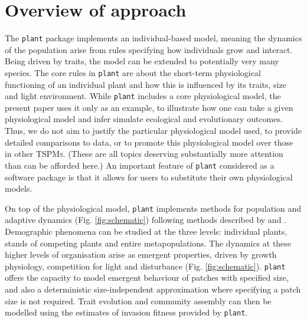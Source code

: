 \documentclass[a4paper,11pt]{article}
\newcommand{\plant}{\texttt{plant}}
\begin{document}
\section{Overview of approach}

The {\plant} package implements an individual-based model, meaning the dynamics of the
population arise from rules specifying how individuals grow and interact.
Being driven by traits, the model can be extended to potentially very many species. The
core rules in {\plant} are about the short-term physiological
functioning of an individual plant and how this is influenced by its
traits, size and light environment.  While {\plant} includes a core physiological model, the present paper uses it only as an example, to illustrate how one can take a given physiological model and infer simulate ecological and evolutionary outcomes. Thus, we do not aim to justify the particular physiological model used, to provide detailed
comparisons to data, or to promote this physiological model over those
in other \textsc{TSPMs}. (These are all topics deserving substantially
more attention than can be afforded here.)
An important feature of {\plant} considered as a software package is that it allows for users to substitute their own physiological models.

On top of the physiological model, {\plant} implements methods for
population and adaptive dynamics (Fig.  \ref{fig:schematic}) following methods
described by \citet{Falster-2011} and \citet{Falster-2015}. Demographic
phenomena can be studied at the three levels: individual plants, stands of
competing plants and entire metapopulations. The dynamics at these higher
levels of organisation arise as emergent properties, driven by growth
physiology, competition for light and disturbance (Fig.  \ref{fig:schematic}).
{\plant} offers the capacity to model emergent behaviour of patches with
specified size, and also a deterministic size-independent approximation
where specifying a patch size is not required. Trait evolution and community
assembly can then be modelled using the estimates of invasion fitness
provided by {\plant}.
\end{document}
